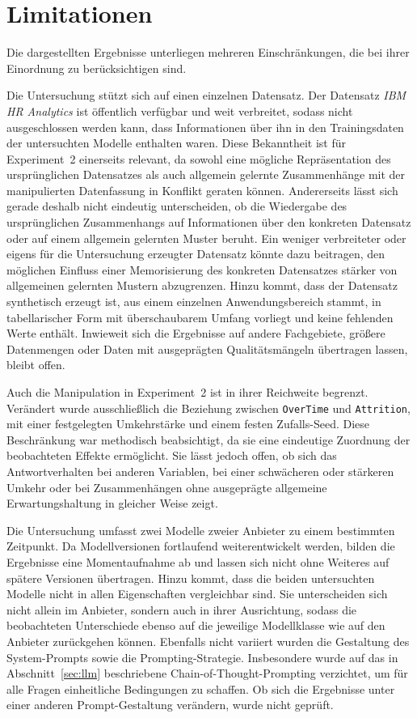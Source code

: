\section{Limitationen}
\label{sec:limitationen}

Die dargestellten Ergebnisse unterliegen mehreren Einschränkungen, die bei ihrer Einordnung zu berücksichtigen sind.

Die Untersuchung stützt sich auf einen einzelnen Datensatz. Der Datensatz \textit{IBM HR Analytics} ist öffentlich verfügbar und weit verbreitet, sodass nicht ausgeschlossen werden kann, dass Informationen über ihn in den Trainingsdaten der untersuchten Modelle enthalten waren. Diese Bekanntheit ist für Experiment~2 einerseits relevant, da sowohl eine mögliche Repräsentation des ursprünglichen Datensatzes als auch allgemein gelernte Zusammenhänge mit der manipulierten Datenfassung in Konflikt geraten können. Andererseits lässt sich gerade deshalb nicht eindeutig unterscheiden, ob die Wiedergabe des ursprünglichen Zusammenhangs auf Informationen über den konkreten Datensatz oder auf einem allgemein gelernten Muster beruht. Ein weniger verbreiteter oder eigens für die Untersuchung erzeugter Datensatz könnte dazu beitragen, den möglichen Einfluss einer Memorisierung des konkreten Datensatzes stärker von allgemeinen gelernten Mustern abzugrenzen. Hinzu kommt, dass der Datensatz synthetisch erzeugt ist, aus einem einzelnen Anwendungsbereich stammt, in tabellarischer Form mit überschaubarem Umfang vorliegt und keine fehlenden Werte enthält. Inwieweit sich die Ergebnisse auf andere Fachgebiete, größere Datenmengen oder Daten mit ausgeprägten Qualitätsmängeln übertragen lassen, bleibt offen.

Auch die Manipulation in Experiment~2 ist in ihrer Reichweite begrenzt. Verändert wurde ausschließlich die Beziehung zwischen \texttt{OverTime} und \texttt{Attrition}, mit einer festgelegten Umkehrstärke und einem festen Zufalls-Seed. Diese Beschränkung war methodisch beabsichtigt, da sie eine eindeutige Zuordnung der beobachteten Effekte ermöglicht. Sie lässt jedoch offen, ob sich das Antwortverhalten bei anderen Variablen, bei einer schwächeren oder stärkeren Umkehr oder bei Zusammenhängen ohne ausgeprägte allgemeine Erwartungshaltung in gleicher Weise zeigt.

Die Untersuchung umfasst zwei Modelle zweier Anbieter zu einem bestimmten Zeitpunkt. Da Modellversionen fortlaufend weiterentwickelt werden, bilden die Ergebnisse eine Momentaufnahme ab und lassen sich nicht ohne Weiteres auf spätere Versionen übertragen. Hinzu kommt, dass die beiden untersuchten Modelle nicht in allen Eigenschaften vergleichbar sind. Sie unterscheiden sich nicht allein im Anbieter, sondern auch in ihrer Ausrichtung, sodass die beobachteten Unterschiede ebenso auf die jeweilige Modellklasse wie auf den Anbieter zurückgehen können. Ebenfalls nicht variiert wurden die Gestaltung des System-Prompts sowie die Prompting-Strategie. Insbesondere wurde auf das in Abschnitt~\ref{sec:llm} beschriebene Chain-of-Thought-Prompting verzichtet, um für alle Fragen einheitliche Bedingungen zu schaffen. Ob sich die Ergebnisse unter einer anderen Prompt-Gestaltung verändern, wurde nicht geprüft.

